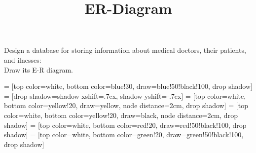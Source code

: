 \documentclass[letter,12pt, potrait]{article}
\title{ER-Diagram}
\begin{document}
\maketitle
Design a database for storing information about medical doctors, their patients, and ilnesses: \\
Draw its E-R diagram.
\\ \break \hfill
\usetikzlibrary{positioning}
\usetikzlibrary{shadows}

 = [top color=white, bottom color=blue!30, 
                          		  draw=blue!50!black!100, drop shadow]
 = [drop shadow={shadow xshift=.7ex, 
                                shadow yshift=-.7ex}]
 = [top color=white, bottom color=yellow!20, 
                               draw=yellow, node distance=2cm, drop shadow]
 = [top color=white, bottom color=yellow!20, 
                               draw=black, node distance=2cm, drop shadow]
 = [top color=white, bottom color=red!20, 
                                  draw=red!50!black!100, drop shadow]
 = [top color=white, bottom color=green!20, 
                         draw=green!50!black!100, drop shadow]
\end{document}
